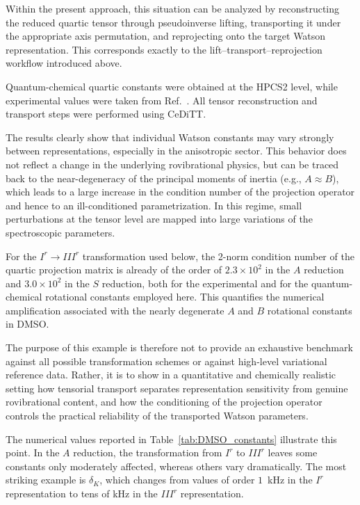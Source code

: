 \documentclass[aip,jcp,reprint,floatfix]{revtex4-2}
\begin{document}
Within the present approach, this situation can be analyzed by
reconstructing the reduced quartic tensor through pseudoinverse
lifting, transporting it under the appropriate axis permutation, and
reprojecting onto the target Watson representation. This corresponds
exactly to the lift--transport--reprojection workflow introduced above.

Quantum-chemical quartic constants were obtained at the HPCS2 
level,\cite{acr_2026} while experimental values were taken from 
Ref.~\cite{Margules2010}. All tensor reconstruction and transport 
steps were performed using CeDiTT.

The results clearly show that individual Watson constants may vary
strongly between representations, especially in the anisotropic
sector. This behavior does not reflect a change in the underlying
rovibrational physics, but can be traced back to the near-degeneracy 
of the principal moments of inertia (e.g., $A \approx B$), which 
leads to a large increase in the condition number of the projection
operator and hence to an ill-conditioned parametrization. In this
regime, small
perturbations at the tensor level are mapped into large variations
of the spectroscopic parameters.

For the $I^r \rightarrow III^r$ transformation used below, the
2-norm condition number of the quartic projection matrix is already of
the order of $2.3\times 10^2$ in the $A$ reduction and
$3.0\times 10^2$ in the $S$ reduction, both for the experimental and
for the quantum-chemical rotational constants employed here. This
quantifies the numerical amplification associated with the nearly
degenerate $A$ and $B$ rotational constants in DMSO.

The purpose of this example is therefore not to provide an exhaustive
benchmark against all possible transformation schemes or against
high-level variational reference data. Rather, it is to show in a
quantitative and chemically realistic setting how tensorial transport
separates representation sensitivity from genuine rovibrational
content, and how the conditioning of the projection operator controls
the practical reliability of the transported Watson parameters.

The numerical values reported in Table~\ref{tab:DMSO_constants}
illustrate this point. In the $A$ reduction, the transformation from
$I^r$ to $III^r$ leaves some constants only moderately affected,
whereas others vary dramatically. The most striking example is
$\delta_K$, which changes from values of order $1$~kHz in the $I^r$
representation to tens of kHz in the $III^r$ representation.
\end{document}
